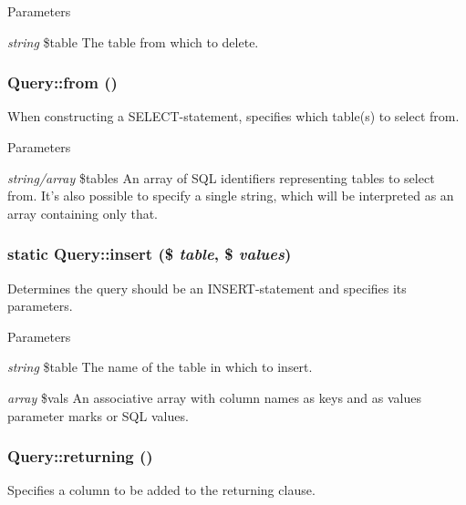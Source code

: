 \begin{DoxyParams}{Parameters}
\item[{\em string}]\$table The table from which to delete. \end{DoxyParams}
\hypertarget{classQuery_aaa091145c66718e59db922d065160863}{
\subsubsection[{from}]{\setlength{\rightskip}{0pt plus 5cm}Query::from ()}}
\label{classQuery_aaa091145c66718e59db922d065160863}
When constructing a SELECT-\/statement, specifies which table(s) to select from.


\begin{DoxyParams}{Parameters}
\item[{\em string/array}]\$tables An array of SQL identifiers representing tables to select from. It's also possible to specify a single string, which will be interpreted as an array containing only that. \end{DoxyParams}
\hypertarget{classQuery_abbefb2e22d6caa9727832bd60ccb46db}{
\subsubsection[{insert}]{\setlength{\rightskip}{0pt plus 5cm}static Query::insert (\$ {\em table}, \/  \$ {\em values})}}
\label{classQuery_abbefb2e22d6caa9727832bd60ccb46db}
Determines the query should be an INSERT-\/statement and specifies its parameters.


\begin{DoxyParams}{Parameters}
\item[{\em string}]\$table The name of the table in which to insert. \item[{\em array}]\$vals An associative array with column names as keys and as values parameter marks or SQL values. \end{DoxyParams}
\hypertarget{classQuery_af44f7bf797779dbbb930e60a53011c6b}{
\subsubsection[{returning}]{\setlength{\rightskip}{0pt plus 5cm}Query::returning ()}}
\label{classQuery_af44f7bf797779dbbb930e60a53011c6b}
Specifies a column to be added to the returning clause.

